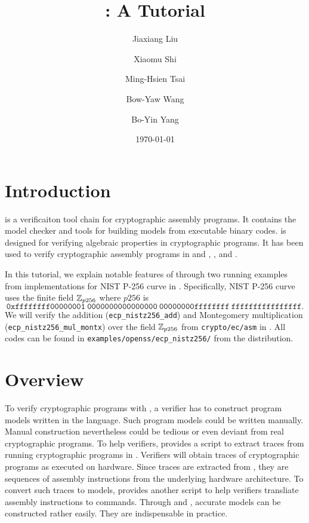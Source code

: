 \documentclass{amsproc}
\begin{document}
\title{\cryptoline: A Tutorial}
\author{Jiaxiang Liu}
\author{Xiaomu Shi}
\author{Ming-Hsien Tsai}
\author{Bow-Yaw Wang}
\author{Bo-Yin Yang}
\date{\today}
\maketitle

\section{Introduction}

\cryptoline is a verificaiton tool chain for cryptographic assembly
programs. It contains the \cryptoline model checker and tools for
building models from executable binary codes. \cryptoline is designed
for verifying algebraic properties in cryptographic programs. It has
been used to verify cryptographic assembly programs in \openssl and
\blst, \pqclean, and \pqmfour.

In this tutorial, we explain notable features of \cryptoline through
two running examples from \xeightysix implementations for NIST P-256 curve
in \openssl. Specifically, NIST P-256 curve uses the finite field
$\mathbb{Z}_{p256}$ where $p256$ is
\[
\mathtt{0xffffffff00000001\ 0000000000000000\ 00000000ffffffff\ 
   ffffffffffffffff}.
\]
We will verify the addition (\texttt{ecp\_nistz256\_add})
and Montegomery multiplication (\texttt{ecp\_nistz256\_mul\_montx})
over the field $\mathbb{Z}_{p256}$ from \texttt{crypto/ec/asm} in \openssl.
All \cryptoline codes can be found in
\texttt{examples/openss/ecp\_nistz256/\xeightysix} from the \cryptoline
distribution. 

\section{\cryptoline Overview}

To verify cryptographic programs with \cryptoline, a verifier has to
construct program models written in the \cryptoline language. Such
program models could be written manually. Manual construction
nevertheless could be tedious or even deviant from real cryptographic
programs. To help verifiers, \cryptoline provides a \python script
\itrace to extract traces from running cryptographic
programs in \gdb. Verifiers will obtain traces of cryptographic 
programs as executed on hardware. Since traces are extracted from
\gdb, they are sequences of assembly instructions from the underlying
hardware architecture. To convert such traces to \cryptoline models,
\cryptoline provides another \python script \tozdsl to
help verifiers transliate assembly instructions to \cryptoline
commands. Through \itrace and \tozdsl, accurate \cryptoline models can
be constructed rather easily. They are indispensable in practice.
\end{document}

